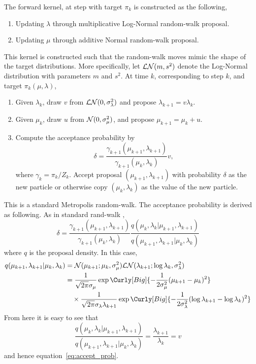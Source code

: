 The forward kernel, at step with target $\pi_k$ is constructed as the
following,
\begin{enumerate}
  \item Updating $\lambda$ through multiplicative Log-Normal random-walk
    proposal.
  \item Updating $\mu$ through additive Normal random-walk proposal.
\end{enumerate}
This kernel is constructed such that the random-walk moves mimic the shape of
the target distributions. More specifically, let $\mathcal{LN}(m,s^2)$ denote the
Log-Normal distribution with parameters $m$ and $s^2$. At time $k$,
corresponding to step $k$, and target $\pi_k(\mu,\lambda)$,
\begin{enumerate}
  \item Given $\lambda_k$, draw $v$ from $\mathcal{LN}(0,\sigma_{\lambda}^2)$ and
    propose $\lambda_{k+1}=v\lambda_k$.
  \item Given $\mu_k$, draw $u$ from $\mathcal{N}(0,\sigma_{\mu}^2)$, and propose
    $\mu_{k+1}=\mu_k+u$.
  \item Compute the acceptance probability by
    \begin{equation}
      \delta = \frac{\gamma_{k+1}(\mu_{k+1},\lambda_{k+1})}
      {\gamma_{k+1}(\mu_k,\lambda_k)}v,
      \label{eq:accept_prob}
    \end{equation}
    where $\gamma_k = \pi_k / Z_k$. Accept proposal $(\mu_{k+1},
    \lambda_{k+1})$ with probability $\delta$ as the new particle or
    otherwise copy $(\mu_k, \lambda_k)$ as the value of the new particle.
\end{enumerate}

\begin{remark}
  This is a standard Metropolis random-walk. The acceptance probability is
  derived as following. As in standard rand-walk \mcmc,
  \begin{equation}
    \delta =
    \frac{\gamma_{k+1}(\mu_{k+1},\lambda_{k+1})}
    {\gamma_{k+1}(\mu_k,\lambda_k)}
    \frac{q(\mu_k,\lambda_k|\mu_{k+1},\lambda_{k+1})}
    {q(\mu_{k+1},\lambda_{k+1}|\mu_k,\lambda_k)}
  \end{equation}
  where $q$ is the proposal density. In this case,
  \begin{align}
    q(\mu_{k+1},\lambda_{k+1}|\mu_k,\lambda_k) &=
    \calN(\mu_{k+1};\mu_k,\sigma_{\mu}^2)
    \calLN(\lambda_{k+1};\log\lambda_{k}, \sigma_{\lambda}^2)
    \allowdisplaybreaks\\
    &= \frac{1}{\sqrt{2\pi}\sigma_{\mu}}
    \exp\Curly[Big]{-\frac{1}{2\sigma_{\mu}^2}(\mu_{k+1} - \mu_k)^2}
    \notag\\ &\quad\times
    \frac{1}{\sqrt{2\pi}\sigma_{\lambda}\lambda_{k+1}}
    \exp\Curly[Big]
    {-\frac{1}{2\sigma_{\lambda}^2}(\log\lambda_{k+1}-\log\lambda_k)^2}
  \end{align}
  From here it is easy to see that
  \begin{equation}
    \frac{q(\mu_k,\lambda_k|\mu_{k+1},\lambda_{k+1})}
    {q(\mu_{k+1},\lambda_{k+1}|\mu_k,\lambda_k)} =
    \frac{\lambda_{k+1}}{\lambda_k} = v
  \end{equation}
  and hence equation~\eqref{eq:accept_prob}.
\end{remark}

